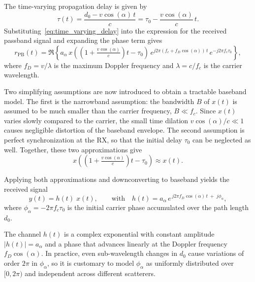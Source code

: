 The time-varying propagation delay is given by
\begin{equation}
\label{eq:time_varying_delay}
    \tau(t)
    = \frac{d_0 - v\cos(\alpha)\,t}{c}
    = \tau_0 - \frac{v\cos(\alpha)}{c}\,t.
\end{equation}
Substituting~\eqref{eq:time_varying_delay} into the expression for the received
passband signal and expanding the phase term gives
\begin{equation}
    r_{\mathrm{PB}}(t)
    = \Re\!\left\{
        a_\alpha \,
        x\!\left((1 + \tfrac{v\cos(\alpha)}{c}) t - \tau_0\right) \,
        e^{j2\pi (f_c + f_D\cos(\alpha))\, t} \,
        e^{-j2\pi f_c \tau_0}
      \right\},
\end{equation}
where $f_D = v / \lambda$ is the maximum Doppler frequency and $\lambda = c / f_c$ is the carrier wavelength.

Two simplifying assumptions are now introduced to obtain a tractable baseband model.
The first is the narrowband assumption: the bandwidth $B$ of $x(t)$ is assumed to be much smaller than the carrier frequency, $B \ll f_c$.
Since $x(t)$ varies slowly compared to the carrier, the small time dilation $v\cos(\alpha)/c \ll 1$ causes negligible distortion of the baseband envelope.
The second assumption is perfect synchronization at the \ac{RX}, so that the initial delay $\tau_0$ can be neglected as well.
Together, these two approximations give
\begin{equation}
    x\!\left(\!\left(1 + \tfrac{v\cos(\alpha)}{c}\right) t - \tau_0\right)
    \approx
    x(t).
\end{equation}

Applying both approximations and downconverting to baseband yields the received signal
\begin{equation}
\label{eq:received_signal_single_scatterer}
    y(t) = h(t) \; x(t),
    \qquad \text{with} \quad
    h(t) = a_\alpha\, e^{\,j2\pi f_D\cos(\alpha)\,t\; +\; j\phi_\alpha},
\end{equation}
where $\phi_\alpha = -2\pi f_c \tau_0$ is the initial carrier phase accumulated over
the path length $d_0$.

The channel $h(t)$ is a complex exponential with constant amplitude $|h(t)| = a_\alpha$ and a phase that advances linearly at the Doppler frequency $f_D \cos(\alpha)$.
In practice, even sub-wavelength changes in $d_0$ cause variations of order $2\pi$ in $\phi_\alpha$, so it is customary to model $\phi_\alpha$ as uniformly distributed over $[0, 2\pi)$ and independent across different scatterers.

